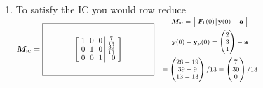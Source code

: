 \documentclass[12pt,letterpaper]{article}
\newcommand{\mat}[1]{\bm{#1}}
\newcommand{\KeyBox}[3]{%
  \vcenter{\hbox{$\boxed{\parbox[c][#2][c]{#1}{\centering\small
    \setlength{\arraycolsep}{3pt}\renewcommand{\arraystretch}{0.95}%
    \ensuremath{\displaystyle #3}}}$}}}
\newcommand{\KeySide}[2]{\quad\vcenter{\hbox{\parbox{#1}{\footnotesize\setlength{\arraycolsep}{2pt}\ensuremath{\begin{gathered}#2\end{gathered}}}}}}
\begin{document}
\begin{enumerate}
\begin{enumerate}
$\mat{M}_{\text{\textsc{uc}}}=\KeyBox{1.8in}{0.80in}{\left[\begin{array}{c|c}-2\mat{I}-\mat{A}&\begin{matrix}-3\\-5\\-1\end{matrix}\end{array}\right]}\KeySide{3.2in}{(-2\mat{I}-\mat{A})\vect{a}=\begin{pmatrix}-3\\-5\\-1\end{pmatrix}\\-2\mat{I}-\mat{A}=\begin{pmatrix}-3&2&0\\-2&-3&0\\0&0&-1\end{pmatrix}\\\vect{a}=\begin{pmatrix}19\\9\\13\end{pmatrix}/13}$
\item To satisfy the IC you would row reduce
$\mat{M}_{\text{\textsc{ic}}}=\KeyBox{1.8in}{0.80in}{\left[\begin{array}{rrr|r}1&0&0&\frac{7}{13}\\0&1&0&\frac{30}{13}\\0&0&1&0\end{array}\right]}\KeySide{3.5in}{\mat{M}_{\text{\textsc{ic}}}=\left[\begin{array}{c|c}\mat{F}_1(0)&\vect{y}(0)-\vect{a}\end{array}\right]\\\vect{y}(0)-\vect{y}_p(0)=\begin{pmatrix}2\\3\\1\end{pmatrix}-\vect{a}\\=\begin{pmatrix}26-19\\39-9\\13-13\end{pmatrix}/13=\begin{pmatrix}7\\30\\0\end{pmatrix}/13}$
\end{enumerate}

\newpage


\end{enumerate}
\end{document}
